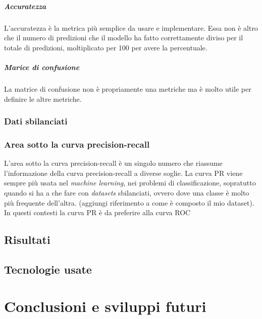 \documentclass[12pt,italian]{report}
\begin{document}
	\paragraph{Accuratezza}
	L'accuratezza è la metrica più semplice da usare e implementare. Essa non è altro che il numero di predizioni che il modello ha fatto correttamente diviso per il totale di predizioni, moltiplicato per 100 per avere la percentuale.
	
	\paragraph{Marice di confusione}
	La matrice di confusione non è propriamente una metriche ma è molto utile per definire le altre metriche.
	
	\subsection{Dati sbilanciati}
	\subsection{Area sotto la curva precision-recall}
	
	
	L'area sotto la curva precision-recall è un singolo numero che riassume l'informazione della curva precision-recall a diverse soglie. La curva PR viene sempre più usata nel \textit{machine learning}, nei problemi di classificazione, sopratutto quando si ha a che fare con \textit{datasets} sbilanciati, ovvero dove una classe è molto più frequente dell'altra. (aggiungi riferimento a come è composto il mio dataset). In questi contesti la curva PR è da preferire alla curva ROC 
	
	\section{Risultati}
	
	\section{Tecnologie usate}
	
	\chapter{Conclusioni e sviluppi futuri}
	
	\nocite{smlbook}
	\nocite{Kingsford2008}
	
	
	
\end{document}
